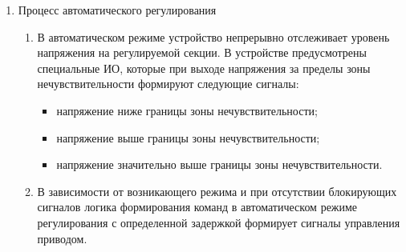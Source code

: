 \begin{enumerate}
\begin{enumerate}
\begin{equation*}
\Delta \dot{U} = \left( \dot{I}{\textsl{св}} - \dot{I}{\textsl{вв}} \right) \cdot \dot{Z}{\textsl{сети}},
\end{equation*}
\item
Значение напряжения на шинах потребителя определяется по формуле:
\begin{equation*}
    {U}_{\textsl{потр}} = \lvert \dot{U}_{\textsl{тек}} - \Delta \dot{U} \rvert,
\end{equation*}


\end{enumerate}


\item Процесс автоматического регулирования 
\begin{enumerate}
\item
В автоматическом режиме устройство непрерывно отслеживает уровень напряжения на регулируемой секции. В устройстве предусмотрены специальные ИО, которые при выходе напряжения за пределы зоны нечувствительности формируют следующие сигналы:
\begin{itemize}
    \item напряжение ниже границы зоны нечувствительности;
    \item напряжение выше границы зоны нечувствительности;
    \item напряжение значительно выше границы зоны нечувствительности.
\end{itemize}
\item
В зависимости от возникающего режима и при отсутствии блокирующих сигналов логика формирования команд в автоматическом режиме регулирования с определенной задержкой формирует сигналы управления приводом.

\end{enumerate}

\end{enumerate}